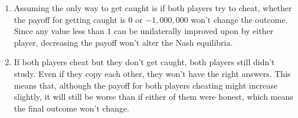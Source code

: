 \documentclass[letterpaper]{article}
\begin{document}
\begin{enumerate}
\begin{enumerate}
        \item Assuming the only way to get caught is if both players try to cheat, whether the payoff for getting caught is $0$ or $-1,000,000$ won't change the outcome. Since any value less than $1$ can be unilaterally improved upon by either player, decreasing the payoff won't alter the Nash equilibria.
        \item If both players cheat but they don't get caught, both players still didn't study. Even if they copy each other, they won't have the right answers. This means that, although the payoff for both players cheating might increase slightly, it will still be worse than if either of them were honest, which means the final outcome won't change.
    \end{enumerate}
\end{enumerate}
\end{document}
